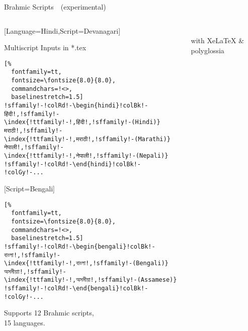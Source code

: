 \documentclass[aspectratio=169,10pt]{beamer}
\begin{document}

\begin{frame}[fragile]{Brahmic Scripts~~{\scriptsize (experimental)}}

\begin{columns}
\begin{column}{52mm}

\setmonofont{Noto Serif Devanagari}[Language=Hindi,Script=Devanagari]
\setmainfont{Noto Sans Mono}
\setsansfont{Noto Sans}
\begin{exampleblock}{Multiscript Inputs in *.tex}
\begin{Verbatim}[%
  fontfamily=tt,
  fontsize=\fontsize{8.0}{8.0},
  commandchars=!<>,
  baselinestretch=1.5]
!sffamily!-!colRd!-\begin{hindi}!colBk!-
हिंदी!,!sffamily!-\index{!ttfamily!-!,हिंदी!,!sffamily!-(Hindi)}
मराठी!,!sffamily!-\index{!ttfamily!-!,मराठी!,!sffamily!-(Marathi)}
नेपाली!,!sffamily!-\index{!ttfamily!-!,नेपाली!,!sffamily!-(Nepali)}
!sffamily!-!colRd!-\end{hindi}!colBk!-
!colGy!-...
\end{Verbatim}
\end{exampleblock}
\setmonofont{Noto Serif Bengali}[Script=Bengali]
\vspace{-4mm}
\begin{exampleblock}{}
\begin{Verbatim}[%
  fontfamily=tt,
  fontsize=\fontsize{8.0}{8.0},
  commandchars=!<>,
  baselinestretch=1.5]
!sffamily!-!colRd!-\begin{bengali}!colBk!-
বাংলা!,!sffamily!-\index{!ttfamily!-!,বাংলা!,!sffamily!-(Bengali)}
অসমীয়াা!,!sffamily!-\index{!ttfamily!-!,অসমীয়া!,!sffamily!-(Assamese)}
!sffamily!-!colRd!-\end{bengali}!colBk!-
!colGy!-...
\end{Verbatim}
\end{exampleblock}
\begin{center}
Supports 12 Brahmic scripts,\\
15 languages.
\end{center}
\end{column}

\begin{column}{75mm}
\begin{center}
\\[1mm]%
\footnotesize with XeLaTeX \& polyglossia
\end{center}
\end{column}
\end{columns}

\end{frame}
\end{document}
